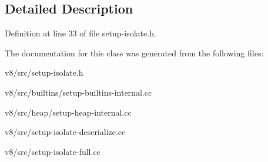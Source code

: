 \subsection{Detailed Description}


Definition at line 33 of file setup-\/isolate.\+h.



The documentation for this class was generated from the following files\+:\begin{DoxyCompactItemize}
\item 
v8/src/setup-\/isolate.\+h\item 
v8/src/builtins/setup-\/builtins-\/internal.\+cc\item 
v8/src/heap/setup-\/heap-\/internal.\+cc\item 
v8/src/setup-\/isolate-\/deserialize.\+cc\item 
v8/src/setup-\/isolate-\/full.\+cc\end{DoxyCompactItemize}

